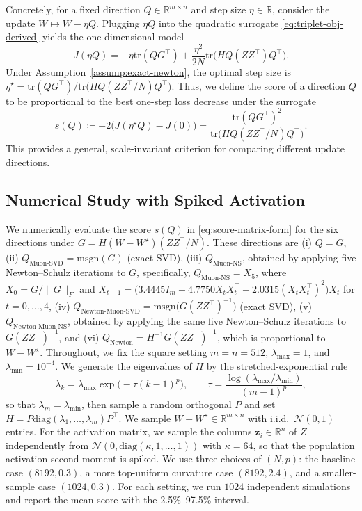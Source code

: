 \documentclass[11pt]{article}
\newcommand{\R}{\mathbb{R}}
\begin{document}
Concretely, for a fixed direction ${Q}\in\R^{m\times n}$ and step size $\eta\in\R$, consider the update ${W}\mapsto {W}-\eta {Q}$.
Plugging $\eta {Q}$ into the quadratic surrogate \eqref{eq:triplet-obj-derived} yields the one-dimensional model
\[
  J(\eta {Q})
   = 
  - \eta \mathrm{tr}({Q}{G}^\top)
  + \frac{\eta^2}{2N} \mathrm{tr} \Big({H} {Q} ({Z}{Z}^\top) {Q}^\top\Big).
\]
Under Assumption~\ref{assump:exact-newton}, the optimal step size is $\eta^\star=\mathrm{tr}({Q}{G}^\top)/\mathrm{tr}\big({H}{Q}({Z}{Z}^\top/N){Q}^\top\big)$.
Thus, we define the score of a direction ${Q}$ to be proportional to the best one-step loss decrease under the surrogate
\begin{equation}
  \label{eq:score-matrix-form}
  s({Q})
  \coloneqq
  -2\big(J(\eta^\star {Q})-J(0)\big)
  =
  \frac{\mathrm{tr}({Q}{G}^\top)^2}{\mathrm{tr}\Big({H}{Q}({Z}{Z}^\top/N){Q}^\top\Big)}.
\end{equation}
This provides a general, scale-invariant criterion for comparing different update directions.


\subsection{Numerical Study with Spiked Activation}
We numerically evaluate the score $s({Q})$ in \eqref{eq:score-matrix-form} for the six directions under ${G}={H}({W}-W^\star)({Z}{Z}^\top/N)$. 
These directions are 
(i) ${Q}={G}$,
(ii) ${Q}_{\mathrm{Muon\text{-}SVD}}=\mathrm{msgn}({G})$ (exact SVD),
(iii) ${Q}_{\mathrm{Muon\text{-}NS}}$, obtained by applying five Newton--Schulz iterations to ${G}$, specifically, ${Q}_{\mathrm{Muon\text{-}NS}}={X}_5$, where ${X}_0={G}/\|{G}\|_F$ and ${X}_{t+1}=\big(3.4445{I}_m-4.7750{X}_t{X}_t^\top+2.0315({X}_t{X}_t^\top)^2\big){X}_t$ for $t=0,\dots,4$,
(iv) ${Q}_{\mathrm{Newton\text{-}Muon\text{-}SVD}}=\mathrm{msgn}\big({G}({Z}{Z}^\top)^{-1}\big)$ (exact SVD),
(v) ${Q}_{\mathrm{Newton\text{-}Muon\text{-}NS}}$, obtained by applying the same five Newton--Schulz iterations to ${G}({Z}{Z}^\top)^{-1}$,
and (vi) ${Q}_{\mathrm{Newton}}={H}^{-1}{G}({Z}{Z}^\top)^{-1}$, which is proportional to ${W}-W^\star$.
Throughout, we fix the square setting $m=n=512$, $\lambda_{\max}=1$, and $\lambda_{\min}=10^{-4}$. We generate the eigenvalues of ${H}$ by the stretched-exponential rule
\[
\lambda_k=\lambda_{\max}\exp\big(-\tau (k-1)^p\big),\qquad
\tau=\frac{\log(\lambda_{\max}/\lambda_{\min})}{(m-1)^p},
\]
so that $\lambda_m=\lambda_{\min}$, then sample a random orthogonal ${P}$ and set ${H}={P} \mathrm{diag}(\lambda_1,\ldots,\lambda_m) {P}^\top$. We sample ${W}-W^\star\in\R^{m\times n}$ with i.i.d.\ $\mathcal{N}(0,1)$ entries. For the activation matrix, we sample the columns $\boldsymbol{z}_i\in\R^n$ of ${Z}$ independently from $\mathcal{N}(0,\mathrm{diag}(\kappa,1,\ldots,1))$ with $\kappa=64$, so that the population activation second moment is spiked. We use three choices of $(N,p)$: the baseline case $(8192,0.3)$, a more top-uniform curvature case $(8192,2.4)$, and a smaller-sample case $(1024,0.3)$. For each setting, we run $1024$ independent simulations and report the mean score with the 2.5\%--97.5\% interval.
\end{document}
